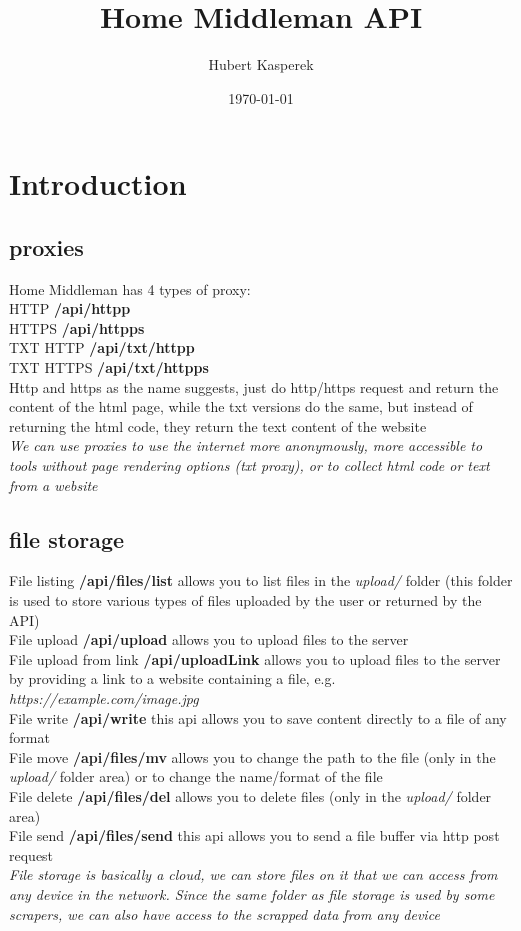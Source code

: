 \documentclass{article}
\begin{document}
\title{Home Middleman API}
\author{Hubert Kasperek}
\date{\today}

\maketitle
\tableofcontents

\clearpage

\fancyhead[L]{\slshape\nouppercase{}}

\section{Introduction}

\subsection{proxies}
Home Middleman has 4 types of proxy:\\
HTTP \textbf{/api/httpp}\\
HTTPS \textbf{/api/httpps}\\
TXT HTTP \textbf{/api/txt/httpp}\\
TXT HTTPS \textbf{/api/txt/httpps}\\
Http and https as the name suggests, just do http/https request and return the content of the html page, while the txt versions do the same, but instead of returning the html code, they return the text content of the website\\
\textit{We can use proxies to use the internet more anonymously, more accessible to tools without page rendering options (txt proxy), or to collect html code or text from a website}
\subsection{file storage}
File listing \textbf{/api/files/list} allows you to list files in the \textit{upload/} folder (this folder is used to store various types of files uploaded by the user or returned by the API)\\
File upload \textbf{/api/upload} allows you to upload files to the server\\
File upload from link \textbf{/api/uploadLink} allows you to upload files to the server by providing a link to a website containing a file, e.g. \textit{https://example.com/image.jpg}\\
File write \textbf{/api/write} this api allows you to save content directly to a file of any format\\
File move \textbf{/api/files/mv} allows you to change the path to the file (only in the \textit{upload/} folder area) or to change the name/format of the file\\
File delete \textbf{/api/files/del} allows you to delete files (only in the \textit{upload/} folder area)\\
File send \textbf{/api/files/send} this api allows you to send a file buffer via http post request\\
\textit{File storage is basically a cloud, we can store files on it that we can access from any device in the network. Since the same folder as file storage is used by some scrapers, we can also have access to the scrapped data from any device}
\end{document}
